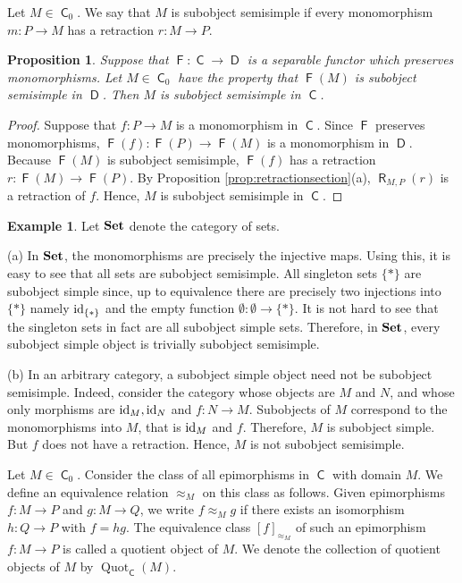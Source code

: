 \documentclass[12pt]{amsart}
\newtheorem{prop}[thm]{Proposition}
\theoremstyle{definition}
\newtheorem{exa}[thm]{Example}
\newcommand{\Set}{{\bf Set}}
\newcommand{\id}{{\rm id}}
\DeclareMathOperator{\C}{\mathsf C}
\DeclareMathOperator{\D}{\mathsf D}
\DeclareMathOperator{\Quot}{Quot}
\DeclareMathOperator{\F}{\mathsf F}
\DeclareMathOperator{\R}{\mathsf R}
\begin{document}
Let $M \in \C_0$.
We say that $M$ is subobject semisimple
if every monomorphism $m: P \to M$ 
has a retraction $r : M \to P$.

\begin{prop}\label{prop:Fsemisimple}
Suppose that $\F : \C \to \D$ is a separable
functor which preserves monomorphisms. 
Let $M \in \C_0$ have the property that
$\F(M)$ is subobject semisimple in $\D$. Then
$M$ is subobject semisimple in $\C$.
\end{prop}

\begin{proof}
Suppose that $f : P \to M$ is a monomorphism in $\C$.
Since $\F$ preserves monomorphisms,
$\F(f) : \F(P) \to \F(M)$ is a monomorphism in $\D$.
Because $\F(M)$ is subobject semisimple, 
$\F(f)$ has a retraction $r : \F(M) \to \F(P)$. 
By 
Proposition \ref{prop:retractionsection}(a),
$\R_{M,P}(r)$ is a retraction of $f$. 
Hence, $M$ is subobject semisimple in $\C$.
\end{proof}

\begin{exa}\label{ex:simplenotsemisimple}
Let $\Set$ denote the category of sets.

(a) In $\Set$, the monomorphisms are
precisely the injective maps.
Using this, it is easy to see that
all sets are subobject semisimple. 
All singleton sets $\{ * \}$ are subobject
simple since, up to equivalence
there are precisely two injections into
$\{ * \}$ namely $\id_{ \{ * \} }$ and
the empty function $\emptyset : 
\emptyset \to \{ * \}$. It is not hard
to see that the singleton sets in fact
are all subobject simple sets.
Therefore, in $\Set$, every
subobject simple object is trivially
subobject semisimple.

(b) In an arbitrary category, a subobject simple object need not be subobject semisimple.
Indeed, consider
the category whose objects are $M$ and $N$, and 
whose only morphisms are $\id_M,\id_N$ and
$f : N \to M$. Subobjects of $M$
correspond to the monomorphisms into $M$,
that is $\id_M$ and $f$. Therefore,
$M$ is subobject simple. But 
$f$ does not have a retraction.
Hence, $M$ is not subobject semisimple.
\end{exa}

Let $M \in \C_0$. 
Consider the class of all epimorphisms
in $\C$ with domain $M$.  
We define an equivalence relation $\approx_M$ on 
this class as follows.
Given epimorphisms $f : M \to P$ and $g : M \to Q$, we write
$f \approx_M g$ if there exists an isomorphism $h : 
Q \to P$ with $f = h g$.
The equivalence class $[f]_{\approx_M}$ of such an 
epimorphism $f : M \to P$ is called a 
quotient object of $M$.  
We denote the collection of quotient objects of $M$ by $\Quot_{\C}(M)$.
\end{document}
